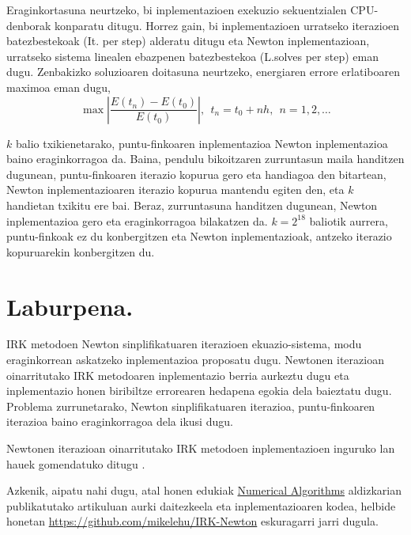 Eraginkortasuna neurtzeko, bi inplementazioen exekuzio sekuentzialen CPU-denborak  konparatu ditugu. Horrez gain, bi inplementazioen urratseko iterazioen batezbestekoak (It. per step) alderatu ditugu eta Newton inplementazioan, urratseko sistema linealen ebazpenen batezbestekoa (L.solves per step) eman dugu. Zenbakizko soluzioaren doitasuna neurtzeko, energiaren errore erlatiboaren maximoa eman dugu,
\begin{equation*}
\max | \frac{E(t_n)-E(t_0)}{E(t_0)}|, \ \  t_n=t_0+nh, \ \ n=1,2,\dots
\end{equation*} 

$k$ balio txikienetarako, puntu-finkoaren inplementazioa Newton inplementazioa baino eraginkorragoa da. Baina, pendulu bikoitzaren zurruntasun maila handitzen dugunean, puntu-finkoaren iterazio kopurua gero eta handiagoa den bitartean, Newton inplementazioaren iterazio kopurua mantendu egiten den, eta $k$ handietan txikitu ere bai. Beraz, zurruntasuna handitzen dugunean, Newton inplementazioa gero eta eraginkorragoa bilakatzen da. $k=2^{18}$ baliotik aurrera, puntu-finkoak ez du konbergitzen eta Newton inplementazioak, antzeko iterazio kopuruarekin konbergitzen du.

 



\section{Laburpena.}

IRK metodoen Newton sinplifikatuaren iterazioen ekuazio-sistema, modu eraginkorrean askatzeko inplementazioa proposatu dugu. Newtonen iterazioan oinarritutako IRK metodoaren inplementazio berria aurkeztu dugu eta inplementazio honen biribiltze errorearen hedapena egokia dela baieztatu dugu. Problema zurrunetarako, Newton sinplifikatuaren iterazioa, puntu-finkoaren iterazioa baino eraginkorragoa dela ikusi dugu.

Newtonen iterazioan oinarritutako IRK metodoen inplementazioen inguruko lan hauek \cite{Butcher1976,Hairer2006} gomendatuko ditugu .

Azkenik, aipatu nahi dugu, atal honen edukiak \href{http://link.springer.com/journal/11075}{Numerical Algorithms} aldizkarian publikatutako \cite{Antonana2017a} artikuluan aurki daitezkeela eta inplementazioaren kodea, helbide honetan   \url{https://github.com/mikelehu/IRK-Newton} eskuragarri jarri dugula.
